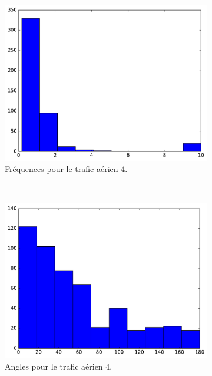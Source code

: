 \begin{figure}
\begin{subfigure}[t]{\subImgWaStats}
			\includegraphics[width=\textwidth]{figures/ch3/flightradar2a_frequency}
			\caption{Fréquences pour le trafic aérien 4.}
			\label{fig:flightradar2a_frequency}
		\end{subfigure}
		~
		\begin{subfigure}[t]{\subImgWaStats}
			\centering
			\includegraphics[width=\textwidth]{figures/ch3/flightradar2a_angle}
			\caption{Angles pour le trafic aérien 4.}
			\label{fig:flightradar2a_angle}
		\end{subfigure}
		\caption[Histogrammes, contrôle du trafic aérien, bis]{}
		\label{fig:histAirControl34}
	\end{figure}
	
